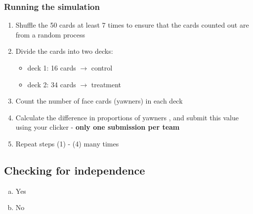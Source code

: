 \documentclass[slidestop,compress,mathserif,12pt,t,professionalfonts,xcolor=table]{beamer}
\begin{document}

\begin{frame}
\frametitle{Running the simulation}

\begin{enumerate}

\item Shuffle the 50 cards at least 7 times to ensure that the cards counted out are from a random process

\item Divide the cards into two decks:
\begin{itemize}
\item deck 1: 16 cards $\rightarrow$ control
\item deck 2: 34 cards $\rightarrow$ treatment
\end{itemize}

\item Count the number of face cards (yawners) in each deck

\item Calculate the difference in proportions of yawners , and submit this value using your clicker - \textbf{only one submission per team}

\item Repeat steps (1) - (4) many times

\end{enumerate}

\vfill


\end{frame}


\subsection{Checking for independence}

\begin{frame}


\begin{multicols}{2}
\begin{enumerate}[(a)]
\item Yes
\item No
\end{enumerate}
\end{multicols}

\end{frame}
\end{document}
